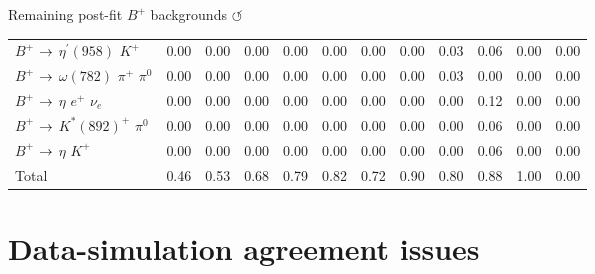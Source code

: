 \documentclass[xcolor=dvipsnames]{beamer}
\begin{document}
\begin{frame}{Remaining post-fit $B^+$ backgrounds \hyperlink{frame:A}{$\circlearrowleft$}}
{\begin{tabular}{lrrrrrrrrrrr}
      $B^{+}$ $\rightarrow$ $\eta^{\prime}(958)$ $K^{+}$                           &         0.00 &         0.00 &         0.00 &         0.00 &         0.00 &         0.00 &         0.00 &         0.03 &         0.06 &         0.00 &         0.00 \\
      $B^{+}$ $\rightarrow$ $\omega(782)$ $\pi^{+}$ $\pi^{0}$                      &         0.00 &         0.00 &         0.00 &         0.00 &         0.00 &         0.00 &         0.00 &         0.03 &         0.00 &         0.00 &         0.00 \\
      $B^{+}$ $\rightarrow$ $\eta$ $e^{+}$ $\nu_{e}$                               &         0.00 &         0.00 &         0.00 &         0.00 &         0.00 &         0.00 &         0.00 &         0.00 &         0.12 &         0.00 &         0.00 \\
      $B^{+}$ $\rightarrow$ $K^{*}(892)^{+}$ $\pi^{0}$                             &         0.00 &         0.00 &         0.00 &         0.00 &         0.00 &         0.00 &         0.00 &         0.00 &         0.06 &         0.00 &         0.00 \\
      $B^{+}$ $\rightarrow$ $\eta$ $K^{+}$                                         &         0.00 &         0.00 &         0.00 &         0.00 &         0.00 &         0.00 &         0.00 &         0.00 &         0.06 &         0.00 &         0.00 \\
      \hline
      Total                                                                &         0.46 &         0.53 &         0.68 &         0.79 &         0.82 &         0.72 &         0.90 &         0.80 &         0.88 &         1.00 &         0.00 \\
      \hline
      \end{tabular}
      }
   
\end{frame}

\section{Data-simulation agreement issues}
\end{document}
